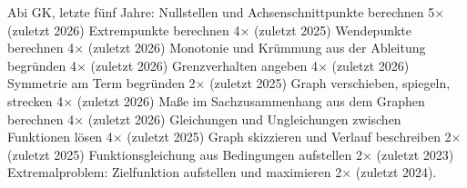 \documentclass[11pt]{article}
\begin{document}
\par\vfill\noindent\begin{minipage}{\linewidth}{\footnotesize\color{black!70}Abi GK, letzte fünf Jahre: Nullstellen und Achsenschnittpunkte berechnen 5× (zuletzt 2026) \textperiodcentered{} Extrempunkte berechnen 4× (zuletzt 2025) \textperiodcentered{} Wendepunkte berechnen 4× (zuletzt 2026) \textperiodcentered{} Monotonie und Krümmung aus der Ableitung begründen 4× (zuletzt 2026) \textperiodcentered{} Grenzverhalten angeben 4× (zuletzt 2026) \textperiodcentered{} Symmetrie am Term begründen 2× (zuletzt 2025) \textperiodcentered{} Graph verschieben, spiegeln, strecken 4× (zuletzt 2026) \textperiodcentered{} Maße im Sachzusammenhang aus dem Graphen berechnen 4× (zuletzt 2026) \textperiodcentered{} Gleichungen und Ungleichungen zwischen Funktionen lösen 4× (zuletzt 2025) \textperiodcentered{} Graph skizzieren und Verlauf beschreiben 2× (zuletzt 2025) \textperiodcentered{} Funktionsgleichung aus Bedingungen aufstellen 2× (zuletzt 2023) \textperiodcentered{} Extremalproblem: Zielfunktion aufstellen und maximieren 2× (zuletzt 2024).\par}\end{minipage}
\end{document}
